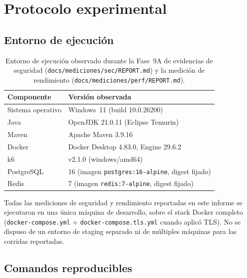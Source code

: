 \chapter{Protocolo experimental}
\label{cap:protocolo-experimental}

\section{Entorno de ejecuci\'on}

\begin{table}[H]
  \centering
  \caption{Entorno de ejecuci\'on observado durante la Fase~9A de evidencias de seguridad (\texttt{docs/mediciones/sec/REPORT.md}) y la medici\'on de rendimiento (\texttt{docs/mediciones/perf/REPORT.md}).}
  \label{tab:entorno-ejecucion}
  \begin{tabular}{@{}ll@{}}
    \toprule
    Componente & Versi\'on observada \\
    \midrule
    Sistema operativo & Windows~11 (build 10.0.26200) \\
    Java & OpenJDK 21.0.11 (Eclipse Temurin) \\
    Maven & Apache Maven 3.9.16 \\
    Docker & Docker Desktop 4.83.0, Engine 29.6.2 \\
    k6 & v2.1.0 (windows/amd64) \\
    PostgreSQL & 16 (imagen \texttt{postgres:16-alpine}, digest fijado) \\
    Redis & 7 (imagen \texttt{redis:7-alpine}, digest fijado) \\
    \bottomrule
  \end{tabular}
\end{table}

Todas las mediciones de seguridad y rendimiento reportadas en este informe
se ejecutaron en una \'unica m\'aquina de desarrollo, sobre el stack Docker
completo (\texttt{docker-compose.yml} + \texttt{docker-compose.tls.yml}
cuando aplic\'o TLS). No se dispuso de un entorno de staging separado ni de
m\'ultiples m\'aquinas para las corridas reportadas.

\section{Comandos reproducibles}

